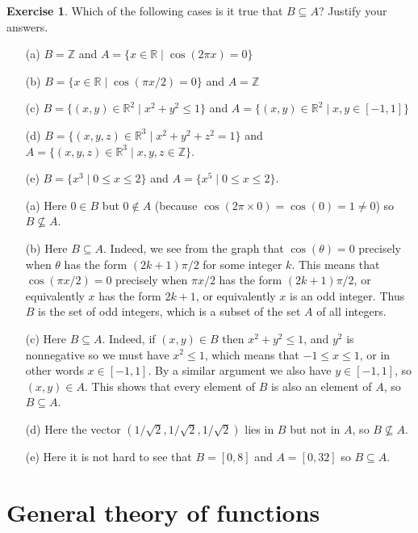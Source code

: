 \documentclass[a4paper]{book}
\newcommand{\Z}         {{\mathbb{Z}}}
\newcommand{\R}         {{\mathbb{R}}}
\newcommand{\tm}        {\times}
\newcommand{\tht}       {\theta}
\newcommand{\sse}       {\subseteq}
\newcommand{\st}        {\;|\;}
\newcommand{\rt}        {\sqrt{2}}
\renewcommand{\:}{\colon}
\theoremstyle{definition}
\newtheorem{exercise}[theorem]{Exercise}
\renewenvironment{solution}{\SolutionInline}{\endSolutionInline}
\begin{document}
\begin{exercise}
 Which of the following cases is it true that $B\sse A$?  Justify your
 answers. 
 \begin{itemize}
  \item[(a)] $B=\Z$ and $A=\{x\in\R\st\cos(2\pi x)=0\}$
  \item[(b)] $B=\{x\in\R\st\cos(\pi x/2)=0\}$ and $A=\Z$
  \item[(c)] $B=\{(x,y)\in\R^2\st x^2+y^2\leq 1\}$ and
             $A=\{(x,y)\in\R^2\st x,y\in[-1,1]\}$
  \item[(d)] $B=\{(x,y,z)\in\R^3\st x^2+y^2+z^2=1\}$ and
             $A=\{(x,y,z)\in\R^3\st x,y,z\in\Z\}$.
  \item[(e)] $B=\{x^3\st 0\leq x\leq 2\}$ and 
             $A=\{x^5\st 0\leq x\leq 2\}$.
 \end{itemize}
\end{exercise}
\begin{solution}
 \begin{itemize}
  \item[(a)] Here $0\in B$ but $0\not\in A$ (because
   $\cos(2\pi\tm 0)=\cos(0)=1\neq 0$) so $B\not\sse A$.
  \item[(b)] Here $B\sse A$.  Indeed, we see from the graph that
   $\cos(\tht)=0$ precisely when $\tht$ has the form $(2k+1)\pi/2$ for
   some integer $k$.  This means that $\cos(\pi x/2)=0$ precisely when
   $\pi x/2$ has the form $(2k+1)\pi/2$, or equivalently $x$ has the
   form $2k+1$, or equivalently $x$ is an odd integer.  Thus $B$ is
   the set of odd integers, which is a subset of the set $A$ of all
   integers. 
  \item[(c)] Here $B\sse A$.  Indeed, if $(x,y)\in B$ then
   $x^2+y^2\leq 1$, and $y^2$ is nonnegative so we must have
   $x^2\leq 1$, which means that $-1\leq x\leq 1$, or in other words
   $x\in[-1,1]$.  By a similar argument we also have $y\in[-1,1]$, so
   $(x,y)\in A$.  This shows that every element of $B$ is also an
   element of $A$, so $B\sse A$.
  \item[(d)] Here the vector $(1/\rt,1/\rt,1/\rt)$ lies in $B$ but not
   in $A$, so $B\not\sse A$.
  \item[(e)] Here it is not hard to see that $B=[0,8]$ and $A=[0,32]$
   so $B\sse A$.
 \end{itemize}
\end{solution}

\chapter{General theory of functions}\label{chap-func}
\end{document}
